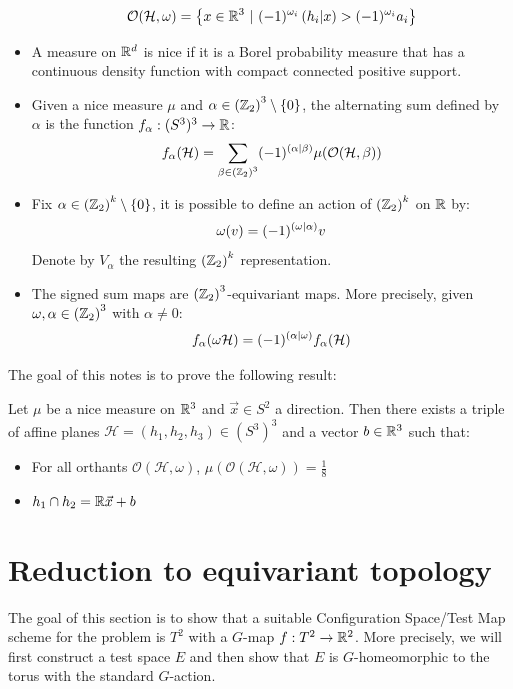 \documentclass[10pt]{article}
\begin{document}
\begin{itemize}
	\[
		\mathcal{O}(\mathcal{H}, \omega) = \left\{ x\in \mathbb{R}^3 \  \vert \ (-1)^{\omega_i}\left( h_i \vert x\right) > (-1)^{\omega_i}a_i \right\}
	\]
	\item A measure on $\mathbb{R}^d$ is nice if it is a Borel probability measure that has a continuous density function with compact connected positive support.
	\item Given a nice measure $\mu$ and $\alpha \in \left(\mathbb{Z}_2\right)^3 \setminus \left\{0\right\}$, the alternating sum defined by $\alpha$ is the function $f_\alpha:(S^3)^3\rightarrow \mathbb{R}$:
	\[
		f_\alpha(\mathcal{H}) = \sum_{\beta\in \left(\mathbb{Z}_2\right)^3} (-1)^{\left( \alpha \vert \beta\right)}\mu(\mathcal{O}(\mathcal{H}, \beta))
	\]
	\item Fix $\alpha\in \left(\mathbb{Z}_2\right)^k\setminus \left\{0\right\}$, it is possible to define an action of $\left(\mathbb{Z}_2\right)^k$ on $\mathbb{R}$ by:
	\[
		\omega(v) = (-1)^{\left( \omega \vert \alpha\right)}v
	\]
	Denote by $V_\alpha$ the resulting $\left(\mathbb{Z}_2\right)^k$ representation.
	\item The signed sum maps are $\left(\mathbb{Z}_2\right)^3$-equivariant maps. More precisely, given $\omega, \alpha \in \left(\mathbb{Z}_2\right)^3$ with $\alpha \neq 0$:
	\[
		f_\alpha(\omega \mathcal{H}) = (-1)^{\left( \alpha \vert \omega\right)}f_\alpha(\mathcal{H})
	\]
\end{itemize}

The goal of this notes is to prove the following result:
\begin{theorem}
	Let $\mu$ be a nice measure on $\mathbb{R}^3$ and $\vec{x} \in S^2$ a direction. Then there exists a triple of affine planes $ \mathcal{H}=(h_1, h_2, h_3) \in (S^3)^3$ and a vector $b\in \mathbb{R}^3$ such that:
	\begin{itemize}
		\item For all orthants $\mathcal{O}(\mathcal{H}, \omega)$, $\mu(\mathcal{O}(\mathcal{H}, \omega)) = \frac{1}{8}$
		\item $h_1 \cap h_2 = \mathbb{R} \vec{x} + b$
	\end{itemize}
\end{theorem}

\section{Reduction to equivariant topology}\label{sec:torus_conf_space}
The goal of this section is to show that a suitable Configuration Space/Test Map scheme for the problem is $T^2$ with a $G$-map $f:T^2 \rightarrow \mathbb{R}^2$. More precisely, we will first construct a test space $E$ and then show that $E$ is $G$-homeomorphic to the torus with the standard $G$-action.
\end{document}
